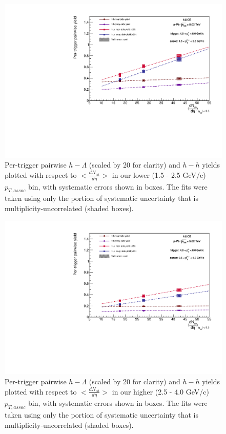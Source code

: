 \documentclass[ALICE,manyauthors]{ALICE_analysis_notes}
\begin{document}
\begin{figure}[ht]
\centering
\includegraphics[width=6in]{figures/pairwise_plot_new_x_axis_lowpt_with_fits.pdf}
\caption{Per-trigger pairwise $h-\Lambda$ (scaled by 20 for clarity) and $h-h$ yields plotted with respect to $<\frac{dN_{ch}}{d\eta}>$ in our lower (1.5 - 2.5 GeV/c) $p_{T, assoc}$ bin, with systematic errors shown in boxes. The fits were taken using only the portion of systematic uncertainty that is multiplicity-uncorrelated (shaded boxes).}
\label{final_pairwise_yields_lowpt_dndeta}

\clearpage 

\end{figure}
\begin{figure}[ht]
\centering
\includegraphics[width=6in]{figures/pairwise_plot_new_x_axis_highpt_with_fits.pdf}
\caption{Per-trigger pairwise $h-\Lambda$ (scaled by 20 for clarity) and $h-h$ yields plotted with respect to $<\frac{dN_{ch}}{d\eta}>$  in our higher (2.5 - 4.0 GeV/c) $p_{T, assoc}$ bin, with systematic errors shown in boxes. The fits were taken using only the portion of systematic uncertainty that is multiplicity-uncorrelated (shaded boxes).}
\label{final_pairwise_yields_highpt_dndeta}
\end{figure}
\end{document}
